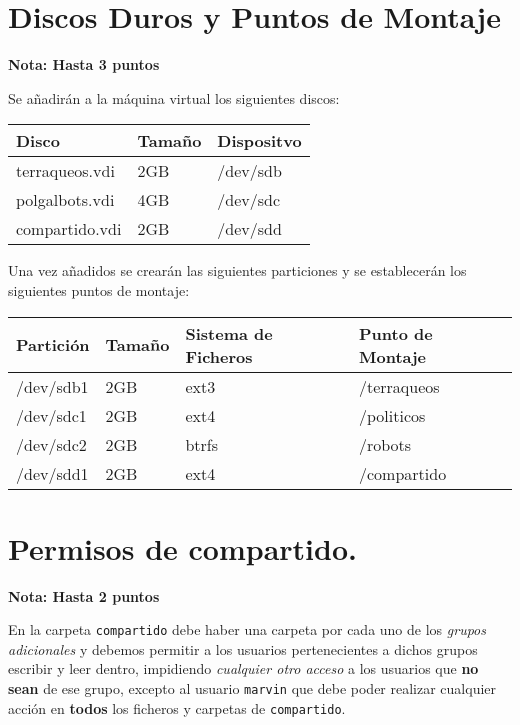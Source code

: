 \documentclass[11pt]{article}
\begin{document}
\section{Discos Duros y Puntos de Montaje}
\label{sec:org30b3288}

\textbf{Nota: Hasta 3 puntos}

Se añadirán a la máquina virtual los siguientes discos:

\begin{center}
\begin{tabular}{lll}
Disco & Tamaño & Dispositvo\\
\hline
terraqueos.vdi & 2GB & /dev/sdb\\
polgalbots.vdi & 4GB & /dev/sdc\\
compartido.vdi & 2GB & /dev/sdd\\
\end{tabular}
\end{center}


Una vez añadidos se crearán las siguientes particiones y se establecerán los
siguientes puntos de montaje:

\begin{center}
\begin{tabular}{llll}
Partición & Tamaño & Sistema de Ficheros & Punto de Montaje\\
\hline
/dev/sdb1 & 2GB & ext3 & /terraqueos\\
/dev/sdc1 & 2GB & ext4 & /politicos\\
/dev/sdc2 & 2GB & btrfs & /robots\\
/dev/sdd1 & 2GB & ext4 & /compartido\\
\end{tabular}
\end{center}

\section{Permisos de compartido.}
\label{sec:org1eaeb5b}

\textbf{Nota: Hasta 2 puntos}

En la carpeta \texttt{compartido} debe haber una carpeta por cada uno de los \emph{grupos
adicionales} y debemos permitir a los usuarios pertenecientes a dichos grupos
escribir y leer dentro, impidiendo \emph{cualquier otro acceso} a los usuarios que
\textbf{no sean} de ese grupo, excepto al usuario \texttt{marvin} que debe poder realizar
cualquier acción en \textbf{todos} los ficheros y carpetas de \texttt{compartido}.
\end{document}
